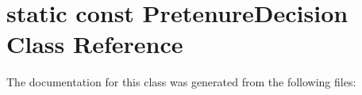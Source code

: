 \hypertarget{classstatic_01const_01PretenureDecision}{}\section{static const Pretenure\+Decision Class Reference}
\label{classstatic_01const_01PretenureDecision}


The documentation for this class was generated from the following files\+: